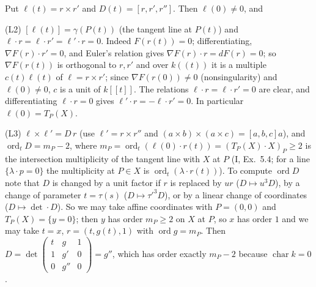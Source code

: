 \documentclass[11pt]{article}
\begin{document}
Put $\ell(t)=r\times r'$ and $D(t)=[r,r',r'']$. Then $\ell(0)\ne0$, and

(L2) $[\ell(t)]=\gamma(P(t))$ (the tangent line at $P(t)$) and $\ell\cdot r=\ell\cdot r'=\ell'\cdot r=0$. Indeed $F(r(t))=0$; differentiating, $\nabla F(r)\cdot r'=0$, and Euler's relation gives $\nabla F(r)\cdot r=dF(r)=0$; so $\nabla F(r(t))$ is orthogonal to $r,r'$ and over $k((t))$ it is a multiple $c(t)\ell(t)$ of $\ell=r\times r'$; since $\nabla F(r(0))\ne0$ (nonsingularity) and $\ell(0)\ne0$, $c$ is a unit of $k[[t]]$. The relations $\ell\cdot r=\ell\cdot r'=0$ are clear, and differentiating $\ell\cdot r=0$ gives $\ell'\cdot r=-\ell\cdot r'=0$. In particular $\ell(0)=T_P(X)$.

(L3) $\ell\times\ell'=D\,r$ (use $\ell'=r\times r''$ and $(a\times b)\times(a\times c)=[a,b,c]a$), and $\operatorname{ord}_tD=m_P-2$, where $m_P=\operatorname{ord}_t(\ell(0)\cdot r(t))=(T_P(X)\cdot X)_P\ge2$ is the intersection multiplicity of the tangent line with $X$ at $P$ (I, Ex.~5.4; for a line $\{\lambda\cdot p=0\}$ the multiplicity at $P\in X$ is $\operatorname{ord}_t(\lambda\cdot r(t))$). To compute $\operatorname{ord}D$ note that $D$ is changed by a unit factor if $r$ is replaced by $ur$ ($D\mapsto u^3D$), by a change of parameter $t=\tau(s)$ ($D\mapsto\tau'^3D$), or by a linear change of coordinates ($D\mapsto\det\cdot D$). So we may take affine coordinates with $P=(0,0)$ and $T_P(X)=\{y=0\}$; then $y$ has order $m_P\ge2$ on $X$ at $P$, so $x$ has order $1$ and we may take $t=x$, $r=(t,g(t),1)$ with $\operatorname{ord}g=m_P$. Then $D=\det\begin{pmatrix}t&g&1\\1&g'&0\\0&g''&0\end{pmatrix}=g''$, which has order exactly $m_P-2$ because $\operatorname{char}k=0$.
\end{document}
